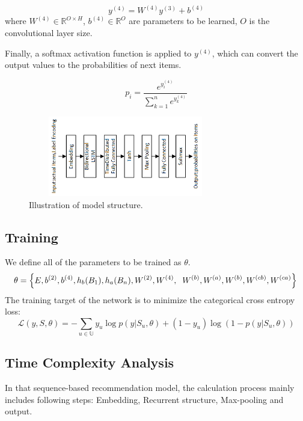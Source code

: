 \documentclass[runningheads]{llncs}
\begin{document}
\begin{equation}
y^{(4)}=W^{(4)}y^{(3)}+b^{(4)}
\end{equation}
where $W^{(4)}\in \mathbb{R}^{O\times H}$, $b^{(4)}\in \mathbb{R}^{O}$ are parameters to be learned, $O$ is the convolutional layer size.

Finally, a softmax activation function is applied to $y^{(4)}$, which can convert the output values to the probabilities of next items. 

\begin{equation}
p_{i}= \frac{e^{y_{i}^{(4)}}}{\sum_{k=1}^{n}e^{y_{k}^{(4)}}}
\end{equation}

\begin{figure}[htbp]
\centerline{\includegraphics[width=8.5cm,height=3.5cm]{image/model.png}}
\caption{Illustration of model structure.}
\label{fig}
\end{figure}
\subsection{Training}

We define all of the parameters to be trained as $\theta $.
\begin{equation}
\theta=  \left \{ E,b^{(2)},b^{(4)},h_{b}(B_{1}),h_{a}(B_{n}),W^{(2)}, W^{(4)},\right.\\
\left.W^{(b)},W^{(a)},W^{(b)},W^{(cb)},W^{(ca)} \right \} \\
\end{equation}
The training target of the network is to minimize the categorical cross entropy loss:
\begin{equation}
\mathcal{L}(y,S,\theta )=-\sum_{u\in \mathbb{U}}y_{u}\log p(y|S_{u},\theta)+(1-y_{u})\log (1-p(y|S_{u},\theta ))
\end{equation}
\subsection{Time Complexity Analysis}

In that sequence-based recommendation model, the calculation process mainly includes following steps: Embedding, Recurrent structure, Max-pooling and output.
\end{document}
